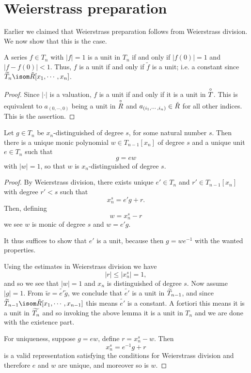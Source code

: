\section{Weierstrass preparation}

Earlier we claimed that Weierstrass preparation follows from Weierstrass division. We now show that
this is the case.

\begin{lemma}
  A series $f \in T_n$ with $\lvert f \rvert = 1$ is a unit in $T_n$ if and only if $\lvert f (0) \rvert = 1$
  and $\lvert f - f(0) \rvert < 1$. Thus, $f$ is a unit if and only if $\tilde{f}$ is a unit;
  i.e. a constant since $\res{T}_{n} \isom \tilde{R}[x_1, \cdots, x_{n}]$.
\end{lemma}

\begin{proof}
  Since $\lvert \cdot \rvert$ is a valuation, $f$ is a unit if and only if it is a unit in $\overset{\circ}{T}$.
  This is equivalent to $a_{(0, \cdots, 0)}$ being a unit in $\overset{\circ}{R}$ and $a_{(i_1,\cdots, i_n)} \in \check{R}$
  for all other indices. This is the assertion.
\end{proof}


\begin{theorem}
  Let $g \in T_n$ be $x_n$-distinguished of degree $s$, for some natural number $s$. Then there is a
  unique monic polynomial $w \in T_{n-1}[x_n]$ of degree $s$ and a unique unit $e \in T_n$ such that
  \[
    g = e w
  \]
  with $\lvert w \rvert = 1$, so that $w$ is $x_n$-distinguished of degree $s$.
\end{theorem}

\begin{proof}
  By Weierstrass division, there exists unique $e' \in T_n$ and $r' \in T_{n-1} [x_n]$ with degree $r' < s$
  such that
  \[
    x_n^s = e' g + r.
  \]
  Then, defining
  \[
    w = x^s_n - r
  \]
  we see $w$ is monic of degree $s$ and $w = e' g$.

  It thus suffices to show that $e'$ is a unit, because then $g = w e^{-1}$ with the wanted properties.

  Using the estimates in Weierstrass division we have
  \[
    \lvert r \rvert \leq \lvert x_n^s \rvert = 1,
  \]
  and so we see that $\lvert w \rvert = 1$ and $x_n$ is distinguished of degree $s$.
  Now assume $\lvert g \rvert = 1$. From $\tilde{w} = \tilde{e'} \tilde{g}$, we conclude that $\tilde{e'}$
  is a unit in $\widetilde{T}_{n-1}$, and since $\res{T}_{n-1} \isom \tilde{R}[x_1, \cdots, x_{n-1}]$ this means
  $\tilde{e'}$ is a constant.
  A fortiori this means it is a unit in $\widetilde{T_n}$ and so invoking the above lemma it is a unit in $T_n$ and
  we are done with the existence part.

  For uniqueness, suppose $g = e w$, define $r = x^s_n - w$. Then
  \[
    x_n^s = e^{-1} g + r
  \]
  is a valid representation satisfying the conditions for Weierstrass division and therefore $e$ and
  $w$ are unique, and moreover so is $w$.
\end{proof}
